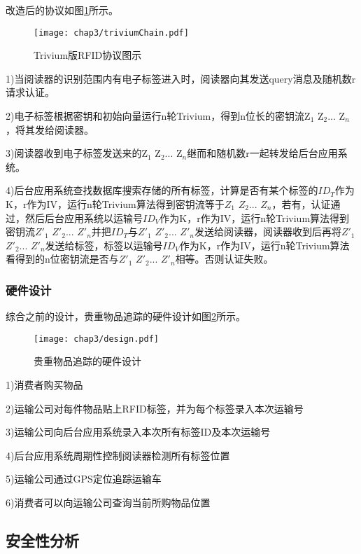改造后的协议如图\ref{fig:Trivium版RFID协议图示}所示。

\begin{figure}[!htp]
	\centering
	\texttt{[image: chap3/triviumChain.pdf]}
	\caption{Trivium版RFID协议图示}\label{fig:Trivium版RFID协议图示}
\end{figure}

1)当阅读器的识别范围内有电子标签进入时，阅读器向其发送query消息及随机数r请求认证。

2)电子标签根据密钥和初始向量运行n轮Trivium，得到n位长的密钥流Z$_{1}$ Z$_{2}$... Z$_{n}$，将其发给阅读器。

3)阅读器收到电子标签发送来的Z$_{1}$ Z$_{2}$... Z$_{n}$继而和随机数r一起转发给后台应用系统。

4)后台应用系统查找数据库搜索存储的所有标签，计算是否有某个标签的$ID_{T}$作为K，r作为IV，运行n轮Trivium算法得到密钥流等于$Z_{1}$ $Z_{2}$... $Z_{n}$，若有，认证通过，然后后台应用系统以运输号$ID_{V}$作为K，r作为IV，运行n轮Trivium算法得到密钥流$Z'_{1}$ $Z'_{2}$... $Z'_{n}$并把$ID_{T}$与$Z'_{1}$ $Z'_{2}$... $Z'_{n}$发送给阅读器，阅读器收到后再将$Z'_{1}$ $Z'_{2}$... $Z'_{n}$发送给标签，标签以运输号$ID_{V}$作为K，r作为IV，运行n轮Trivium算法看得到的n位密钥流是否与$Z'_{1}$ $Z'_{2}$... $Z'_{n}$相等。否则认证失败。

\subsubsection{硬件设计}

综合之前的设计，贵重物品追踪的硬件设计如图\ref{fig:贵重物品追踪的硬件设计}所示。

\begin{figure}[!htp]
	\centering
	\texttt{[image: chap3/design.pdf]}
	\caption{贵重物品追踪的硬件设计}\label{fig:贵重物品追踪的硬件设计}
\end{figure}

1)消费者购买物品

2)运输公司对每件物品贴上RFID标签，并为每个标签录入本次运输号

3)运输公司向后台应用系统录入本次所有标签ID及本次运输号

4)后台应用系统周期性控制阅读器检测所有标签位置

5)运输公司通过GPS定位追踪运输车

6)消费者可以向运输公司查询当前所购物品位置

\subsection{安全性分析}

